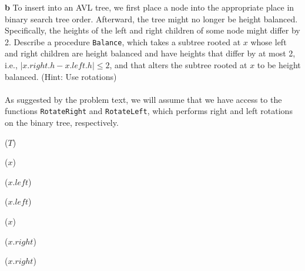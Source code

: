 \documentclass[11pt,english]{article}
\begin{document}
\newpage
\noindent \large{\textbf{b} \mdseries To insert into an AVL tree, we first
place a node into the appropriate place in binary search tree order.
Afterward, the tree might no longer be height balanced. Specifically, the
heights of the left and right children of some node might differ by 2.
Describe a procedure \texttt{Balance}, which takes a subtree rooted at $x$
whose left and right children are height balanced and have heights that differ
by at most 2, i.e., $|x.right.h - x.left.h| \leq 2$, and that alters the
subtree rooted at $x$ to be height balanced. (Hint: Use rotations)}
\\\\
As suggested by the problem text, we will assume that we have access to the
functions \texttt{RotateRight} and \texttt{RotateLeft}, which performs right
and left rotations on the binary tree, respectively.
\begin{algorithm}
	\BlankLine
	
	\Balance($T$) \\
	\Begin
	{
		{
			\RotateLeft($x$)
			
			{
				\RotateRight($x.left$)
			}
		
			\Balance($x.left$)
		}
		
		{
			\RotateRight($x$)
			
			{
				\RotateLeft($x.right$)
			}
			
			\Balance($x.right$)
		}
	}
\end{algorithm}
\end{document}
